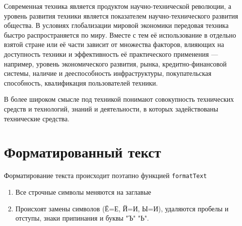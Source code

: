\documentclass[a4paper, 14pt]{extarticle}
\begin{document}
Современная техника является продуктом научно-технической революции, а уровень развития техники является показателем научно-технического развития общества. В условиях глобализации мировой экономики передовая техника быстро распространяется по миру. Вместе с тем её использование в отдельно взятой стране или её части зависит от множества факторов, влияющих на доступность техники и эффективность её практического применения — например, уровень экономического развития, рынка, кредитно-финансовой системы, наличие и дееспособность инфраструктуры, покупательская способность, квалификация пользователей техники.

В более широком смысле под техникой понимают совокупность технических средств и технологий, знаний и деятельности, в которых задействованы технические средства. 

\section{Форматированный текст}

Форматирование текста происходит поэтапно функцией \texttt{formatText}
\begin{enumerate}
    \item Все строчные символы меняются на заглавые
    \item Происхоят замены символов (Ё=Е, Й=И, Ы=И), удаляются пробелы и отступы, знаки припинания и буквы "Ъ" "Ь".
\end{enumerate}
\end{document}
